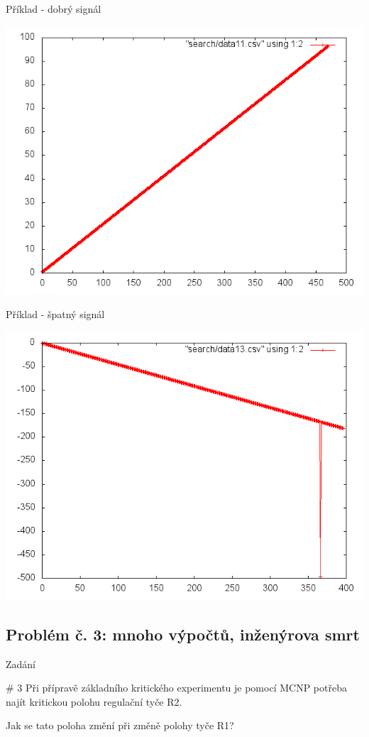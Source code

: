 \documentclass{beamer}
\begin{document}
\begin{frame}{Příklad - dobrý signál}
  \begin{center}
      \includegraphics[width=0.6\columnwidth]{search_good}
      \end{center}
\end{frame}
\begin{frame}{Příklad - špatný signál}
  \begin{center}
      \includegraphics[width=0.6\columnwidth]{search_bad}
      \end{center}
\end{frame}



\subsection{Problém č. 3: mnoho výpočtů, inženýrova smrt}

\begin{frame}{Zadání}
  \begin{block}{\# 3}
    Při přípravě základního kritického experimentu je pomocí MCNP potřeba najít kritickou polohu regulační tyče R2.

    Jak se tato poloha změní při změně polohy tyče R1?
  \end{block}
\end{frame}
\end{document}
